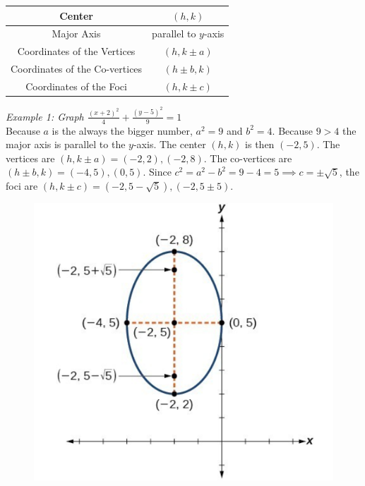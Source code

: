 \documentclass{article}
\begin{document}
    \begin{center}
        \begin{tabular} {|c|c|}
            \hline
            Center                         & $(h,k)$              \\
            \hline
            Major Axis                     & parallel to $y$-axis \\
            \hline
            Coordinates of the Vertices    & $(h, k\pm a)$        \\
            \hline
            Coordinates of the Co-vertices & $(h\pm b, k)$        \\
            \hline
            Coordinates of the Foci        & $(h, k\pm c)$        \\
            \hline
        \end{tabular}
    \end{center}

    \noindent \color{blue} \textit{Example 1: Graph $\frac{(x+2)^2}{4}+\frac{(y-5)^2}{9}=1$}
    \color{black} \\
    \noindent Because $a$ is the always the bigger number, $a^2=9$ and $b^2=4$. Because
    $9>4$ the major axis is parallel to the $y$-axis. The center $(h,k)$ is then $(-2,5)$. The
    vertices are $(h,k\pm a)=(-2,2),(-2,8)$. The co-vertices are $(h\pm b,k)=(-4,5),(0,5)$.
    Since $c^2=a^2-b^2=9-4=5\implies c=\pm\sqrt{5}$, the foci are $(h,k\pm c)=(-2,5-\sqrt{5}),
    (-2,5\pm 5)$. \\

    \begin{figure} [hbt!]
        \centering
        \includegraphics [scale=0.5] {Resources/Unit10Conics/ellipse2.PNG}
    \end{figure}
\end{document}
